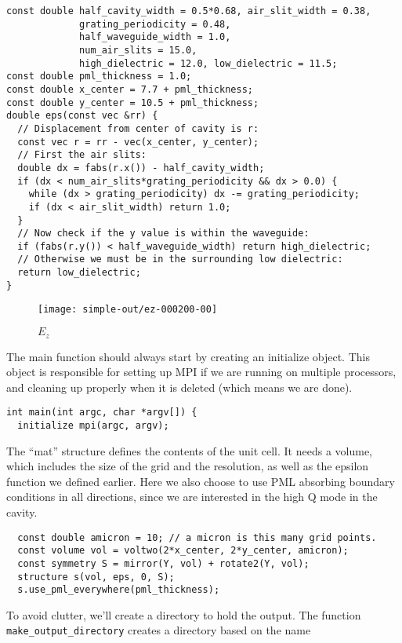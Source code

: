 \begin{verbatim}
const double half_cavity_width = 0.5*0.68, air_slit_width = 0.38,
             grating_periodicity = 0.48,
             half_waveguide_width = 1.0,
             num_air_slits = 15.0,
             high_dielectric = 12.0, low_dielectric = 11.5;
const double pml_thickness = 1.0;
const double x_center = 7.7 + pml_thickness;
const double y_center = 10.5 + pml_thickness;
double eps(const vec &rr) {
  // Displacement from center of cavity is r:
  const vec r = rr - vec(x_center, y_center);
  // First the air slits:
  double dx = fabs(r.x()) - half_cavity_width;
  if (dx < num_air_slits*grating_periodicity && dx > 0.0) {
    while (dx > grating_periodicity) dx -= grating_periodicity;
    if (dx < air_slit_width) return 1.0;
  }
  // Now check if the y value is within the waveguide:
  if (fabs(r.y()) < half_waveguide_width) return high_dielectric;
  // Otherwise we must be in the surrounding low dielectric:
  return low_dielectric;
}
\end{verbatim}
\begin{figure}
\label{simple_figure}
\caption{$E_z$}
\begin{center}
\texttt{[image: simple-out/ez-000200-00]}
\end{center}
\end{figure}
The main function should always start by creating an initialize object.
This object is responsible for setting up MPI if we are running on multiple
processors, and cleaning up properly when it is deleted (which means we are
done).
\begin{verbatim}
int main(int argc, char *argv[]) {
  initialize mpi(argc, argv);
\end{verbatim}
The ``mat'' structure defines the contents of the unit cell.  It needs a
volume, which includes the size of the grid and the resolution, as well as
the epsilon function we defined earlier.  Here we also choose to use PML
absorbing boundary conditions in all directions, since we are interested in
the high Q mode in the cavity.
\begin{verbatim}
  const double amicron = 10; // a micron is this many grid points.
  const volume vol = voltwo(2*x_center, 2*y_center, amicron);
  const symmetry S = mirror(Y, vol) + rotate2(Y, vol);
  structure s(vol, eps, 0, S);
  s.use_pml_everywhere(pml_thickness);
\end{verbatim}
To avoid clutter, we'll create a directory to hold the output.  The
function \verb!make_output_directory! creates a directory based on the name
